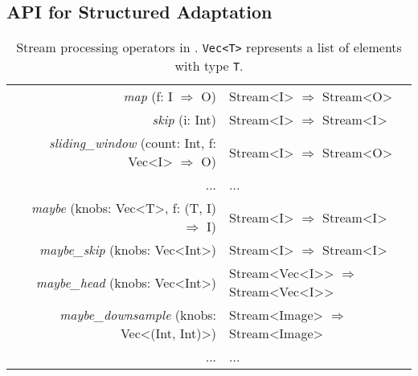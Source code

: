 \subsection{API for Structured Adaptation}
\label{sec:structure-adapt}

\begin{table*}
  \small
  \centering
  \begin{tabular}{ c r l }
    \toprule
    & \textit{map} (f: I $\Rightarrow$ O) & Stream<I> $\Rightarrow$ Stream<O> \\
    & \textit{skip} (i: Int) & Stream<I> $\Rightarrow$
                                   Stream<I> \\
    & \textit{sliding\_window} (count: Int, f: Vec<I> $\Rightarrow$ O) & Stream<I> $\Rightarrow$
                                                                            Stream<O> \\
    & ... & ... \\
    \midrule
    & \textit{maybe} (knobs: Vec<T>, f:  (T, I) $\Rightarrow$ I) & Stream<I> $\Rightarrow$
                                                                 Stream<I> \\
    & \textit{maybe\_skip} (knobs: Vec<Int>) & Stream<I> $\Rightarrow$ Stream<I> \\
    & \textit{maybe\_head} (knobs: Vec<Int>) & Stream<Vec<I>{}> $\Rightarrow$
                                                   Stream<Vec<I>{}> \\
    & \textit{maybe\_downsample} (knobs: Vec<(Int, Int)>) & Stream<Image> $\Rightarrow$ Stream<Image> \\
    & ... & ... \\
    \bottomrule
  \end{tabular}
  \vspace{0.2em}
  \caption{Stream processing operators in \sysname{}. \texttt{Vec<T>} represents
    a list of elements with type \texttt{T}.}
  \label{tab:operators}
\end{table*}

